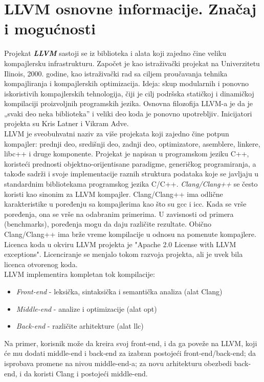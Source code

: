 \documentclass[10pt]{extarticle}
\begin{document}
\section{LLVM osnovne informacije. Značaj i mogućnosti}
\noindent
Projekat \textit{\textbf{LLVM}} sastoji se iz biblioteka i alata koji zajedno čine veliku kompajlersku infrastrukturu. Započet je kao istraživački projekat na Univerzitetu Ilinois, 2000. godine, kao istraživački rad sa ciljem proučavanja tehnika kompajliranja i kompajlerskih optimizacija. Ideja: skup modularnih i ponovno iskoristivih kompajlerskih tehnologija, čiji je cilj podršska statičkoj i dinamičkoj kompilaciji proizvoljnih programskih jezika. 
Osnovna filozofija LLVM-a je da je „svaki deo neka biblioteka” i veliki deo koda je ponovno upotrebljiv. Inicijatori projekta su Kris Latner i Vikram Adve. \\
LLVM je sveobuhvatni naziv za više projekata koji zajedno čine potpun kompajler: prednji deo, središnji deo, zadnji deo, optimizatore, asemblere, linkere, libc++ i druge komponente. Projekat je napisan u programskom jeziku C++, koristeći prednosti objektno-orijentisane paradigme, generičkog programiranja, a takođe sadrži i svoje implementacije raznih struktura podataka koje se javljaju u standardnim bibliotekama programskog jezika C/C++.
\textit{Clang/Clang++} se često koristi kao sinonim za LLVM kompajler. Clang/Clang++ ima odlične karakteristike u poređenju sa kompajlerima kao što su gcc i icc. Kada se vrše poređenja, ona se vrše na odabranim primerima. U zavisnosti od primera (benchmarks), poređenja mogu da daju različite rezultate. Obično Clang/Clang++ ima brže vreme kompilacije u odnosu na pomenute kompajlere. \\
Licenca koda u okviru LLVM projekta je "Apache 2.0 License with LLVM exceptions". Licenciranje se menjalo tokom razvoja projekta, ali je uvek bila licenca otvorenog koda.\\
LLVM implementira kompletan tok kompilacije: 
\begin{itemize}
    \item \textit{Front-end} - leksička, sintaksička i semantička analiza (alat Clang)
    \item \textit{Middle-end} - analize i optimizacije (alat opt)
    \item \textit{Back-end} - različite arhitekture (alat llc)
\end{itemize}
Na primer, korisnik može da kreira svoj front-end, i da ga poveže na LLVM, koji će mu dodati middle-end i back-end za izabran postojeći front-end/back-end; da isprobava promene na nivou middle-end-a; za novu arhitekturu obezbedi back-end, i da koristi Clang i postojeći middle-end.
\newpage
\end{document}
